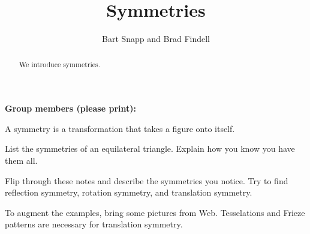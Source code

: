 \documentclass[handout]{ximera}
\title{Symmetries}
\author{Bart Snapp and Brad Findell}
\begin{document}
\begin{abstract}
  We introduce symmetries.
\end{abstract}
\maketitle

\noindent\textbf{Group members (please print):}\ \hrulefill \\

\hrulefill

\begin{definition}
A symmetry is a transformation that takes a figure onto itself.  
\end{definition}
\begin{problem}
List the symmetries of an equilateral triangle.  Explain how you know you have them all.  
\end{problem}

\begin{problem}
Flip through these notes and describe the symmetries you notice.  Try to find reflection symmetry, rotation symmetry, and translation symmetry.  
\end{problem}

\begin{teachingnote}
To augment the examples, bring some pictures from Web.   Tesselations and Frieze patterns are necessary for translation symmetry.  
\end{teachingnote}
\end{document}
